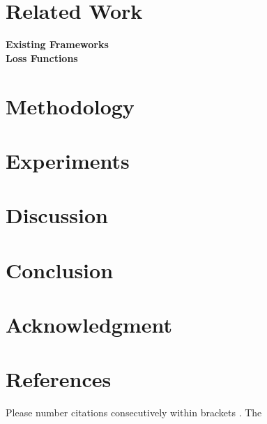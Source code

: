 \documentclass[conference]{IEEEtran}
\begin{document}

\section{Related Work}
\textbf{Existing Frameworks} \\


\textbf{Loss Functions} \\


\section{Methodology}


\section{Experiments}


\section{Discussion}


\section{Conclusion}


\section*{Acknowledgment}


\section*{References}

Please number citations consecutively within brackets \cite{IEEEhowto:IEEEtranpage}. The 






\end{document}
